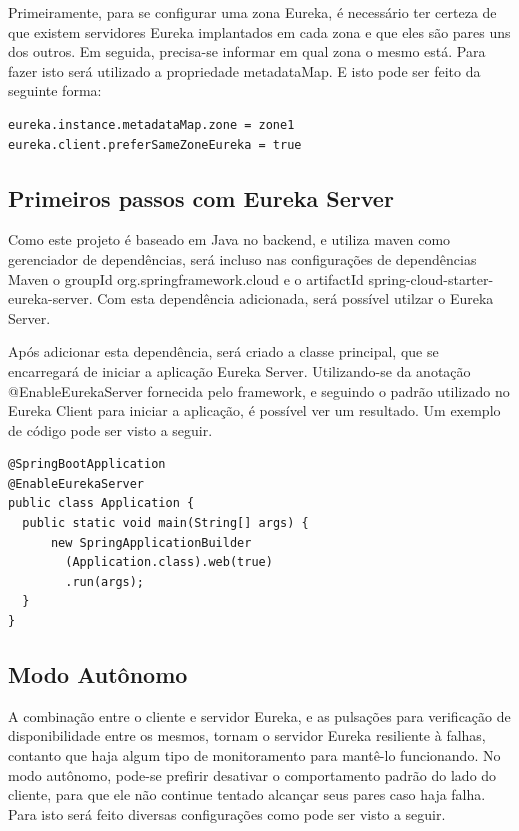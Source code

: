\documentclass[journal]{IEEEtran}
\begin{document}
Primeiramente, para se configurar uma zona Eureka, é necessário ter certeza de que existem servidores Eureka implantados em cada zona e que eles são pares uns dos outros. Em seguida, precisa-se informar em qual zona o mesmo está. Para fazer isto será utilizado a propriedade metadataMap. E isto pode ser feito da seguinte forma:

\begin{verbatim}
eureka.instance.metadataMap.zone = zone1
eureka.client.preferSameZoneEureka = true
\end{verbatim}

\subsection{Primeiros passos com Eureka Server}

Como este projeto é baseado em Java no backend, e utiliza maven como gerenciador de dependências, será incluso nas configurações de dependências Maven o groupId org.springframework.cloud e o artifactId spring-cloud-starter-eureka-server. Com esta dependência adicionada, será possível utilzar o Eureka Server.

Após adicionar esta dependência, será criado a classe principal, que se encarregará de iniciar a aplicação Eureka Server. Utilizando-se da anotação @EnableEurekaServer fornecida pelo framework, e seguindo o padrão utilizado no Eureka Client para iniciar a aplicação, é possível ver um resultado. Um exemplo de código pode ser visto a seguir.

\begin{verbatim}
@SpringBootApplication
@EnableEurekaServer
public class Application {
  public static void main(String[] args) {
      new SpringApplicationBuilder
        (Application.class).web(true)
        .run(args);
  }
}
\end{verbatim}

\subsection{Modo Autônomo}

A combinação entre o cliente e servidor Eureka, e as pulsações para verificação de disponibilidade entre os mesmos, tornam o servidor Eureka
resiliente à falhas, contanto que haja algum tipo de monitoramento para mantê-lo funcionando. No modo autônomo, pode-se prefirir desativar o comportamento padrão do lado do cliente, para que ele não continue tentado alcançar seus pares caso haja falha. Para isto será feito diversas configurações como pode ser visto a seguir.
\end{document}
